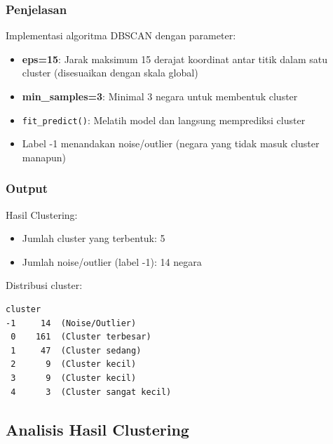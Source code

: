 \documentclass[12pt,a4paper]{article}
\begin{document}
\subsubsection{Penjelasan}
Implementasi algoritma DBSCAN dengan parameter:
\begin{itemize}
    \item \textbf{eps=15}: Jarak maksimum 15 derajat koordinat antar titik dalam satu cluster (disesuaikan dengan skala global)
    \item \textbf{min\_samples=3}: Minimal 3 negara untuk membentuk cluster
    \item \texttt{fit\_predict()}: Melatih model dan langsung memprediksi cluster
    \item Label -1 menandakan noise/outlier (negara yang tidak masuk cluster manapun)
\end{itemize}

\subsubsection{Output}
Hasil Clustering:
\begin{itemize}
    \item Jumlah cluster yang terbentuk: 5
    \item Jumlah noise/outlier (label -1): 14 negara
\end{itemize}

Distribusi cluster:
\begin{verbatim}
cluster
-1     14  (Noise/Outlier)
 0    161  (Cluster terbesar)
 1     47  (Cluster sedang)
 2      9  (Cluster kecil)
 3      9  (Cluster kecil)
 4      3  (Cluster sangat kecil)
\end{verbatim}

\subsection{Analisis Hasil Clustering}
\end{document}
